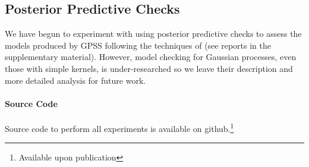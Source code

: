 \documentclass{article}
\begin{document}
\subsection{Posterior Predictive Checks}

We have begun to experiment with using posterior predictive checks to assess the models produced by GPSS following the techniques of \cite{Gelman1996} (see reports in the supplementary material).
However, model checking for Gaussian processes, even those with simple kernels, is under-researched so we leave their description and more detailed analysis for future work.

\paragraph{Source Code}
Source code to perform all experiments is available on github.\footnote{Available upon publication}







\end{document}
